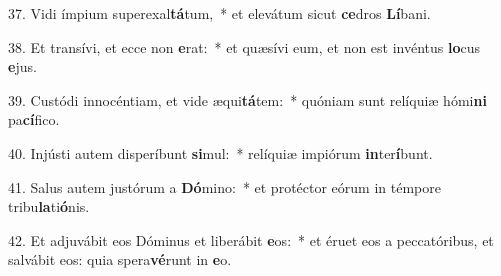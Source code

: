 37. Vidi ímpium superexal\textbf{tá}tum,~*  et elevátum sicut \textbf{ce}dros \textbf{Lí}bani.\

38. Et transívi, et ecce non \textbf{e}rat:~*  et quæsívi eum, et non est invéntus \textbf{lo}cus \textbf{e}jus.\

39. Custódi innocéntiam, et vide æqui\textbf{tá}tem:~*  quóniam sunt relíquiæ hómi\textbf{ni} pa\textbf{cí}fico.\

40. Injústi autem disperíbunt \textbf{si}mul:~*  relíquiæ impiórum \textbf{in}ter\textbf{í}bunt.\

41. Salus autem justórum a \textbf{Dó}mino:~*  et protéctor eórum in témpore tribu\textbf{la}ti\textbf{ó}nis.\

42. Et adjuvábit eos Dóminus et liberábit \textbf{e}os:~*  et éruet eos a peccatóribus, et salvábit eos: quia spera\textbf{vé}runt in \textbf{e}o.\

